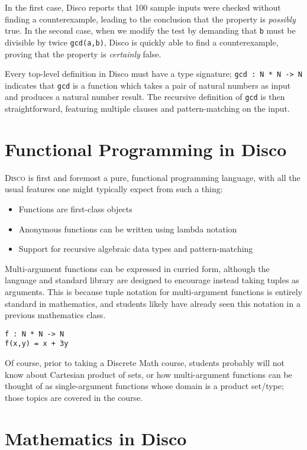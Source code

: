 \documentclass[submission,copyright,creativecommons]{eptcs}
\newcommand{\disco}{\textsc{Disco}\xspace}
\begin{document}
In the first case, Disco reports that 100 sample inputs were checked
without finding a counterexample, leading to the conclusion that the
property is \emph{possibly} true.  In the second case, when we modify
the test by demanding that \verb|b| must be divisible by twice
\verb|gcd(a,b)|, Disco is quickly able to find a counterexample,
proving that the property is \emph{certainly} false.

Every top-level definition in Disco must have a type signature;
\verb|gcd : N * N -> N| indicates that \verb|gcd| is a function which
takes a pair of natural numbers as input and produces a natural number
result.  The recursive definition of \verb|gcd| is then
straightforward, featuring multiple clauses and pattern-matching on
the input.

\section{Functional Programming in Disco}
\label{sec:FP}

\disco is first and foremost a pure, functional programming language,
with all the usual features one might typically expect from such a thing:
\begin{itemize}
\item Functions are first-class objects
\item Anonymous functions can be written using lambda notation
\item Support for recursive algebraic data types and pattern-matching
\end{itemize}

Multi-argument functions can be expressed in curried form, although
the language and standard library are designed to encourage instead
taking tuples as arguments.  This is because tuple notation for
multi-argument functions is entirely standard in mathematics, and
students likely have already seen this notation in a previous
mathematics class.

\begin{verbatim}
f : N * N -> N
f(x,y) = x + 3y
\end{verbatim}

Of course, prior to taking a Discrete Math course, students probably
will not know about Cartesian product of sets, or how multi-argument
functions can be thought of as single-argument functions whose domain
is a product set/type; those topics are covered in the course.

\section{Mathematics in Disco}
\label{sec:math}
\end{document}
